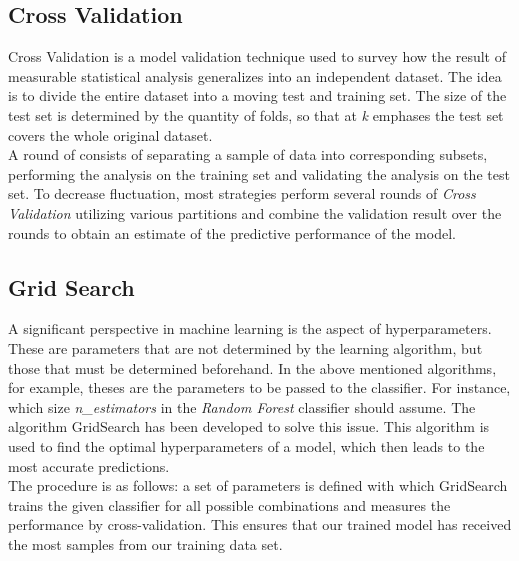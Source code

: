 \documentclass[a4paper, 11pt,titlepage,oneside,openany]{book}
\begin{document}
\subsection{Cross Validation}
Cross Validation is a model validation technique used to survey how the result of measurable statistical analysis generalizes into an independent dataset. The idea is to divide the entire dataset into a moving test and training set. The size of the test set is determined by the quantity of folds, so that at \textit{k} emphases the test set covers the whole original dataset.\\
\noindent A round of  consists of separating a sample of data into corresponding subsets, performing the analysis on the training set and validating the analysis on the test set. To decrease fluctuation, most strategies perform several rounds of \textit{Cross Validation} utilizing various partitions and combine the validation result over the rounds to obtain an estimate of the predictive performance of the model.

\subsection{Grid Search}
A significant perspective in machine learning is the aspect of hyperparameters. These are parameters that are not determined by the learning algorithm, but those that must be determined beforehand. In the above mentioned algorithms, for example, theses are the parameters to be passed to the classifier. For instance, which size \textit{n\_estimators} in the \textit{Random Forest} classifier should assume. The algorithm GridSearch has been developed to solve this issue. This algorithm is used to find the optimal hyperparameters of a model, which then leads to the most accurate predictions. \\
\noindent The procedure is as follows: a set of parameters is defined with which GridSearch trains the given classifier for all possible combinations and measures the performance by cross-validation. This ensures that our trained model has received the most samples from our training data set. 
\end{document}
